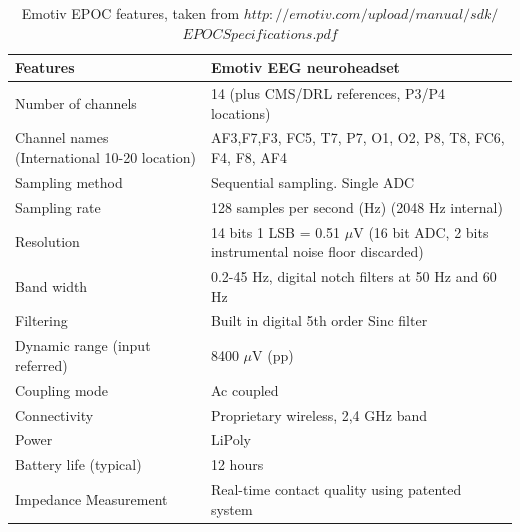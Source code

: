 \begin{table}[ht]
\centering
\tabulinesep=2mm
\begin{tabu}{| m{.47\linewidth} | m{.47\linewidth} |}
			
			\hline 
			\textbf{Features} & \textbf{Emotiv EEG neuroheadset}  \\
			\hline 
			Number of channels & 14 (plus CMS/DRL references, P3/P4 locations)   \\
			\hline 
			Channel names (International 10-20 location)  & AF3,F7,F3, FC5, T7, P7, O1, O2, P8, T8, FC6, F4, F8, AF4  \\
			\hline 
			Sampling method & Sequential sampling. Single ADC \\
			\hline 
			Sampling rate & 128 samples per second (Hz) (2048 Hz internal) \\
			\hline
			Resolution & 14 bits 1 LSB = 0.51 $\mu$V (16 bit ADC, 2 bits instrumental noise floor discarded) \\
			\hline
			Band width & 0.2-45 Hz, digital notch filters at 50 Hz and 60 Hz\\
			\hline
			Filtering & Built in digital 5th order Sinc filter\\
            \hline
			Dynamic range (input referred) & 8400 $\mu$V (pp)\\
            \hline
			Coupling mode & Ac coupled\\
            \hline
			Connectivity & Proprietary wireless, 2,4 GHz band\\
            \hline
			Power & LiPoly \\
            \hline
			Battery life (typical) & 12 hours \\
            \hline
			Impedance Measurement & Real-time contact quality using patented system \\
            \hline
		\end{tabu}
        
\caption{Emotiv EPOC features, taken from \textbf{$http://emotiv.com/upload/manual/sdk/$
$EPOCSpecifications.pdf$}}
\label{table:1}
\end{table}




